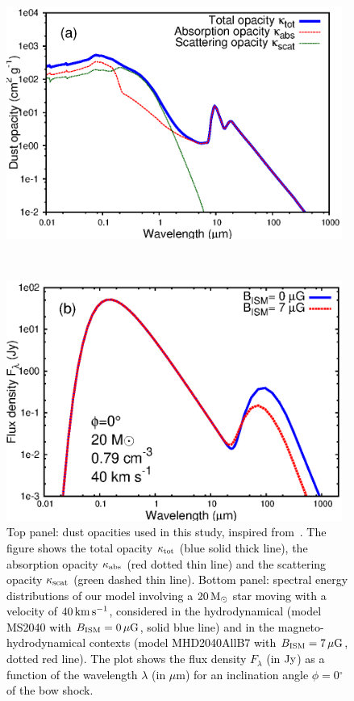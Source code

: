 \documentclass[useAMS,usenatbib]{mn2e}
\newcommand{\degree}{\ensuremath{^\circ}}
\begin{document}
\begin{figure}
	\begin{minipage}[b]{ 0.50\textwidth}
		\includegraphics[width=0.98\textwidth]{./opacity.eps}
	\end{minipage} 	\\
	\begin{minipage}[b]{ 0.50\textwidth}
		\includegraphics[width=0.98\textwidth]{./plot_seds_mhd.eps}
	\end{minipage}	
	\caption{
	         \textcolor{black}{
	         Top panel: dust opacities used in this study, inspired from~\citet{acreman_mnras_456_2016}. 
	         The figure shows the total opacity 
	         $\kappa_{\rm tot}$ (blue solid thick line), the absorption opacity $\kappa_{\rm abs}$ (red dotted thin line) 
	         and the scattering opacity $\kappa_{\rm scat}$ (green dashed thin line).  
	         } 
	         \textcolor{black}{
	         Bottom panel: spectral energy distributions of our model involving a $20\, \rm M_{\odot}$ star 
	         moving with a velocity of $40\, \rm km\, \rm s^{-1}$, considered in the hydrodynamical 
	         (model MS2040 with $B_{\rm ISM}=0\, \mu \rm G$, solid blue line) and 
	         in the magneto-hydrodynamical contexts (model MHD2040AllB7 with $B_{\rm ISM}=7\, \mu \rm G$, dotted red line).
	         The plot shows the flux density $F_{\lambda}$ (in $\rm Jy$) as a function 
	         of the wavelength $\lambda$ (in $\mu$m) for an inclination angle $\phi=0\degree$ of the bow shock. 
	         }	         
		 }
	\label{fig:dust}  
\end{figure}
\end{document}
